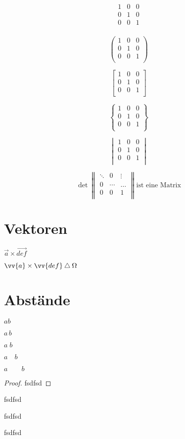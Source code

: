 \[%
\begin{matrix} 
1 & 0 & 0 \\ 
0 & 1 & 0 \\ 
0 & 0 & 1 \\ 
\end{matrix}
\]

\[%
\begin{pmatrix} 
1 & 0 & 0 \\ 
0 & 1 & 0 \\ 
0 & 0 & 1 \\ 
\end{pmatrix}
\]

\[%
\begin{bmatrix} 
1 & 0 & 0 \\ 
0 & 1 & 0 \\ 
0 & 0 & 1 \\ 
\end{bmatrix}
\]

\[%
\begin{Bmatrix} 
1 & 0 & 0 \\ 
0 & 1 & 0 \\ 
0 & 0 & 1 \\ 
\end{Bmatrix}
\]


\[%
\begin{vmatrix} 
1 & 0 & 0 \\ 
0 & 1 & 0 \\ 
0 & 0 & 1 \\ 
\end{vmatrix}
\]

\[%
\det 
\begin{Vmatrix} 
\ddots  & 0 & \vdots \\ 
0 & \cdots & \dots \\ 
0 & 0 & 1 \\ 
\end{Vmatrix}
\text{ist eine Matrix}
\]

\section{Vektoren}

\( \vec{a} \times \vec{def} \)

\( \vv{a} \times \vv{def} \bigtriangleup \Omega  \)

\section{Abstände}

\( ab \) %

\(a\,b \)

\(a\;b\)

\(a\quad b\)

\(a\qquad b\)


\begin{proof}
fsdfsd
\end{proof}

\begin{theorem}
fsdfsd
\end{theorem}

\begin{lemma}
fsdfsd
\end{lemma}

\begin{corollary}
fsdfsd
\end{corollary}